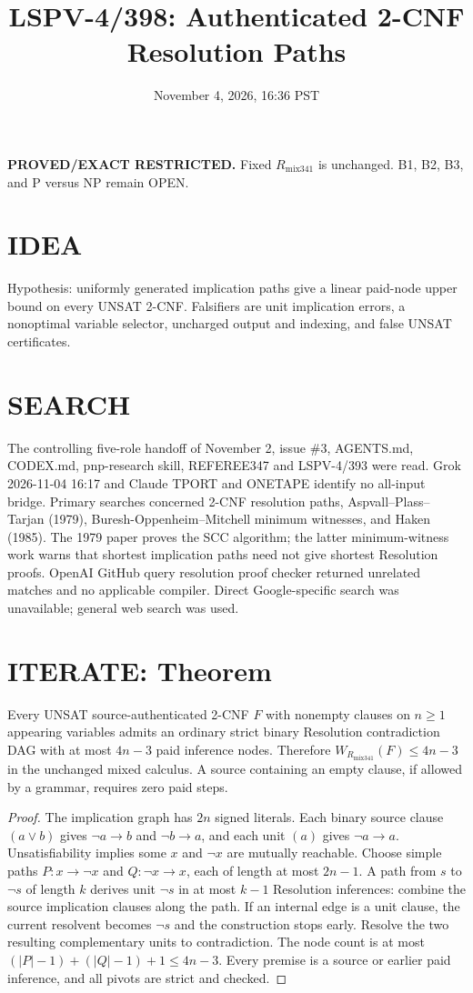 \documentclass{article}
\title{LSPV-4/398: Authenticated 2-CNF Resolution Paths}
\date{November 4, 2026, 16:36 PST}
\begin{document}
\maketitle
\noindent\textbf{PROVED/EXACT RESTRICTED.} Fixed $R_{\mathrm{mix341}}$ is unchanged. B1, B2, B3, and P versus NP remain OPEN.
\section*{IDEA}
Hypothesis: uniformly generated implication paths give a linear paid-node upper bound on every UNSAT 2-CNF. Falsifiers are unit implication errors, a nonoptimal variable selector, uncharged output and indexing, and false UNSAT certificates.
\section*{SEARCH}
The controlling five-role handoff of November 2, issue \#3, AGENTS.md, CODEX.md, pnp-research skill, REFEREE347 and LSPV-4/393 were read. Grok 2026-11-04 16:17 and Claude TPORT and ONETAPE identify no all-input bridge. Primary searches concerned 2-CNF resolution paths, Aspvall--Plass--Tarjan (1979), Buresh-Oppenheim--Mitchell minimum witnesses, and Haken (1985). The 1979 paper proves the SCC algorithm; the latter minimum-witness work warns that shortest implication paths need not give shortest Resolution proofs. OpenAI GitHub query resolution proof checker returned unrelated matches and no applicable compiler. Direct Google-specific search was unavailable; general web search was used.
\section*{ITERATE: Theorem}
Every UNSAT source-authenticated 2-CNF $F$ with nonempty clauses on $n\ge1$ appearing variables admits an ordinary strict binary Resolution contradiction DAG with at most $4n-3$ paid inference nodes. Therefore $W_{R_{\mathrm{mix341}}}(F)\le 4n-3$ in the unchanged mixed calculus. A source containing an empty clause, if allowed by a grammar, requires zero paid steps.
\begin{proof}
The implication graph has $2n$ signed literals. Each binary source clause $(a\lor b)$ gives $\neg a\to b$ and $\neg b\to a$, and each unit $(a)$ gives $\neg a\to a$. Unsatisfiability implies some $x$ and $\neg x$ are mutually reachable. Choose simple paths $P:x\to\neg x$ and $Q:\neg x\to x$, each of length at most $2n-1$. A path from $s$ to $\neg s$ of length $k$ derives unit $\neg s$ in at most $k-1$ Resolution inferences: combine the source implication clauses along the path. If an internal edge is a unit clause, the current resolvent becomes $\neg s$ and the construction stops early. Resolve the two resulting complementary units to contradiction. The node count is at most $(|P|-1)+(|Q|-1)+1\le4n-3$. Every premise is a source or earlier paid inference, and all pivots are strict and checked.
\end{proof}
\end{document}
